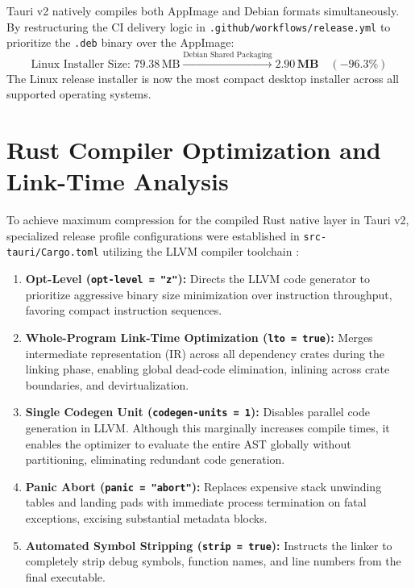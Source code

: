 \documentclass[11pt,a4paper]{article}
\begin{document}
Tauri v2 natively compiles both AppImage and Debian formats simultaneously. By restructuring the CI delivery logic in \texttt{.github/workflows/release.yml} to prioritize the \texttt{.deb} binary over the AppImage:
\begin{equation}
    \text{Linux Installer Size: } 79.38\,\text{MB} \xrightarrow{\text{Debian Shared Packaging}} \mathbf{2.90\,\text{MB}} \quad (\mathbf{-96.3\%})
\end{equation}
The Linux release installer is now the most compact desktop installer across all supported operating systems.

\section{Rust Compiler Optimization and Link-Time Analysis}
\label{sec:rust_opt}

To achieve maximum compression for the compiled Rust native layer in Tauri v2, specialized release profile configurations were established in \texttt{src-tauri/Cargo.toml} utilizing the LLVM compiler toolchain \cite{llvm2004}:

\begin{enumerate}
    \item \textbf{Opt-Level (\texttt{opt-level = "z"}):} Directs the LLVM code generator to prioritize aggressive binary size minimization over instruction throughput, favoring compact instruction sequences.
    \item \textbf{Whole-Program Link-Time Optimization (\texttt{lto = true}):} Merges intermediate representation (IR) across all dependency crates during the linking phase, enabling global dead-code elimination, inlining across crate boundaries, and devirtualization.
    \item \textbf{Single Codegen Unit (\texttt{codegen-units = 1}):} Disables parallel code generation in LLVM. Although this marginally increases compile times, it enables the optimizer to evaluate the entire AST globally without partitioning, eliminating redundant code generation.
    \item \textbf{Panic Abort (\texttt{panic = "abort"}):} Replaces expensive stack unwinding tables and landing pads with immediate process termination on fatal exceptions, excising substantial metadata blocks.
    \item \textbf{Automated Symbol Stripping (\texttt{strip = true}):} Instructs the linker to completely strip debug symbols, function names, and line numbers from the final executable.
\end{enumerate}
\end{document}
